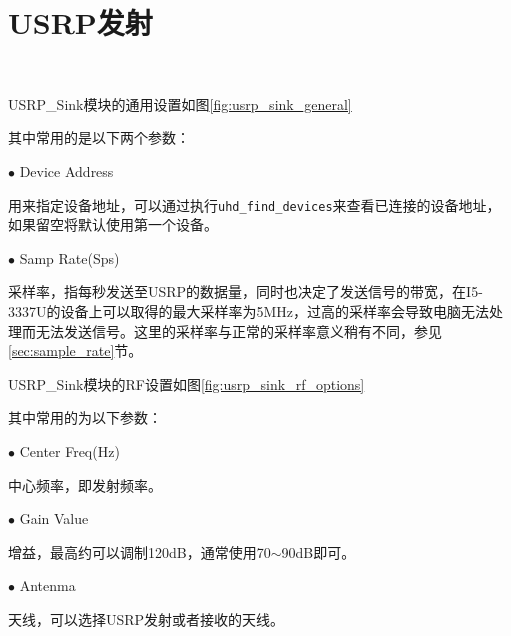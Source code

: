 	\section{USRP发射}
		\begin{figure}[htp]
			\centering
			 \\
		\end{figure}
		\par USRP\_Sink模块的通用设置如图\ref{fig:usrp_sink_general}
		\par 其中常用的是以下两个参数：
		\par $\bullet$ Device Address
		\par 用来指定设备地址，可以通过执行\lstinline[language=sh]{uhd_find_devices}来查看已连接的设备地址，如果留空将默认使用第一个设备。
		\par $\bullet$ Samp Rate(Sps)
		\par 采样率，指每秒发送至USRP的数据量，同时也决定了发送信号的带宽，在I5-3337U的设备上可以取得的最大采样率为5MHz，过高的采样率会导致电脑无法处理而无法发送信号。这里的采样率与正常的采样率意义稍有不同，参见\ref{sec:sample_rate}节。
		\par USRP\_Sink模块的RF设置如图\ref{fig:usrp_sink_rf_options}
		\par 其中常用的为以下参数：
		\par $\bullet$ Center Freq(Hz)
		\par 中心频率，即发射频率。
		\par $\bullet$ Gain Value
		\par 增益，最高约可以调制120dB，通常使用70$\sim$90dB即可。
		\par $\bullet$ Antenma
		\par 天线，可以选择USRP发射或者接收的天线。
